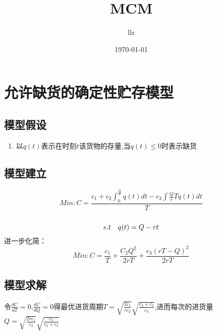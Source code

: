 \documentclass[12pt,a4paper]{article}
\title{MCM}
\author{llz}
\date{\today}
\begin{document}
\kaishu
\maketitle


\section{允许缺货的确定性贮存模型}
\subsection{模型假设}
\begin{enumerate}
，单位时间（每天）对物品的需求量恒为$r$吨；即经营商品单一，顾客对该物品需求量在时间上保持恒定；
$T$天进货$Q$吨；且假设每次进货是在存货全部售出后即刻进行，允许缺货，即$Q\le rT$;
$c_1$，在正常期间，还需支付货物的贮存费用，单位时间（天）单位（吨）货物需支付货物的贮存费用$c_2$;每天单位时间（天）单位（吨）货物需支付缺货费$c_3$；
\item 以$q(t)$表示在时刻$t$该货物的存量,当$q(t)\le 0$时表示缺货
\end{enumerate}
\subsection{模型建立}
 $$Min:C=\frac{c_1+c_2\int_{0}^{\frac{Q}{r}}q(t)dt-c_3\int{\frac{Q}{r}}{T}q(t)dt}{T}$$\\
\begin{displaymath}
 s.t \quad q(t)=Q-rt\\
\end{displaymath}
进一步化简：\\
$$Min: C=\frac{c_1}{T}+\frac{C_2 Q^2}{2rT}+\frac{c_3{(rT-Q)}^2}{2rT}$$
\subsection{模型求解}
令$\frac{dC}{dT}=0$,$\frac{dC}{dQ}=0$得最优进货周期$T=\sqrt{\frac{2c_1}{rc_2}}\sqrt{\frac{c_2+c_3}{c_3}}$,进而每次的进货量
$Q=\sqrt{\frac{2rc_1}{c_2}}\sqrt{\frac{c_3}{c_2+c_3}}$\\
\end{document}
